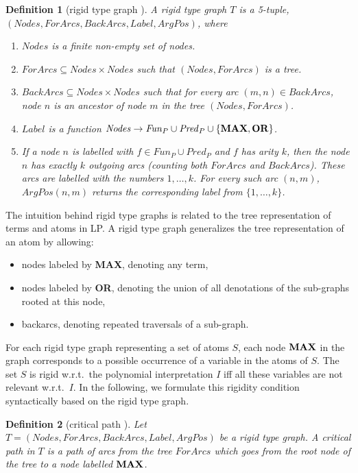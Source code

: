 \documentclass[envcountsame]{tlp}
\newcounter{ex:der-lastsymconsctr}
\newtheorem{definition}{Definition}
\begin{document}
\begin{definition}[rigid type graph \cite{Janssensetal92}] 
\label{rigidtypegraph}
A rigid type graph $T$ is a 5-tuple, $(\mathit{Nodes}, \mathit{ForArcs},
\mathit{BackArcs}, \mathit{Label}, \mathit{ArgPos})$, where 
\begin{enumerate}
    \item[1.] $\mathit{Nodes}$ is a finite non-empty set of nodes.
    \item[2.] $\mathit{ForArcs} \subseteq \mathit{Nodes} \times
\mathit{Nodes}$ such that 
$(\mathit{Nodes},\mathit{ForArcs})$ is a tree.
    \item[3.] $\mathit{BackArcs} \subseteq \mathit{Nodes} \times
\mathit{Nodes}$
 such that for every
arc $(m,n) \in \mathit{BackArcs}$, node $n$ is an ancestor of node $m$ in the tree $(\mathit{Nodes},\mathit{ForArcs})$.
    \item[4.] $\mathit{Label}$ is a function $\mathit{Nodes} \rightarrow 
\mathit{Fun}_P 
\cup \mathit{Pred}_P \cup \{\mbox{\rm \textbf{MAX}},\mbox{\rm \textbf{OR}}\}$.
    \item[5.] If a node $n$ is labelled with $f \in \mathit{Fun}_P \cup
\mathit{Pred}_P$ and $f$ has arity $k$, then the node $n$ has exactly $k$ outgoing arcs (counting both $\mathit{ForArcs}$
and $\mathit{BackArcs}$). These arcs are labelled with the numbers
$1,\ldots,k$.  For every such arc $(n,m)$, $\mathit{ArgPos}(n,m)$ returns
the corresponding label from $\{1,\ldots,k\}$.
\end{enumerate}
\end{definition}




The intuition behind rigid type graphs is related to the tree representation 
of terms and atoms in LP. A rigid type graph generalizes the tree representation
of an atom by allowing:
\begin{itemize}
\item nodes labeled by \mbox{\rm \textbf{MAX}}, denoting any term,
\item nodes labeled by \mbox{\rm \textbf{OR}}, denoting the union of all denotations of the sub-graphs rooted at this node,
\item backarcs, denoting repeated traversals of a sub-graph.
\end{itemize}


For each rigid type graph representing a set of atoms $S$, each node $\mbox{\rm	\textbf{MAX}}$ in
the graph corresponds to a possible occurrence of a variable in the atoms of $S$. The
set $S$ is rigid w.r.t.\ the polynomial interpretation $I$ iff all these variables
are not relevant w.r.t.\ $I$. In the following, we formulate this
rigidity condition syntactically based on the rigid type graph.
\begin{definition}[critical path \protect\cite{Decorteetal98}]
\label{criticalpath}
    Let $T\!=\!(\mathit{Nodes}, \mathit{ForArcs}, \mathit{BackArcs},
\mathit{Label}, \mathit{ArgPos})$ be a rigid type graph. A 
critical path in $T$ is a path of arcs from the tree $\mathit{ForArcs}$ which goes from
the root node of the tree to a node 
labelled $\mbox{\rm \textbf{MAX}}$. 
\end{definition}
\end{document}
